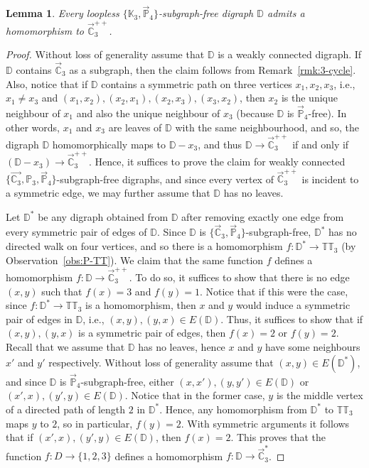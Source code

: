 \documentclass{article}
\newtheorem{lemma}[theorem]{Lemma}
\theoremstyle{definition}
\theoremstyle{remark}
\newcommand{\bC}{{\mathbb C}}
\newcommand{\bD}{{\mathbb D}}
\newcommand{\bK}{{\mathbb K}}
\newcommand{\bP}{{\mathbb P}}
\newcommand{\bT}{{\mathbb T}}
\begin{document}
\begin{lemma}\label{lem:C3++-P4-subgraph-free}
    Every loopless $\{\bK_3,\vec{\bP}_4\}$-subgraph-free digraph $\bD$ admits a homomorphism
    to $\vec{\bC}_3^{++}$.
\end{lemma}
\begin{proof}
    Without loss of generality assume that $\bD$ is a weakly connected digraph. 
    If $\bD$ contains $\vec{\bC}_3$ as a subgraph, then the claim follows from Remark~\ref{rmk:3-cycle}.
    Also, notice that if $\bD$ contains a symmetric path on three vertices $x_1,x_2,x_3$, i.e.,
    $x_1\neq x_3$ and $(x_1,x_2),(x_2,x_1),(x_2,x_3),(x_3,x_2)$, then
    $x_2$ is the unique neighbour of $x_1$ and also the unique neighbour of $x_3$ (because
    $\bD$ is $\vec{\bP}_4$-free). In other words, $x_1$ and $x_3$ are leaves of $\bD$
    with the same neighbourhood, and so, the digraph $\bD$ homomorphically maps to
    $\bD-x_3$, and thus $\bD\to \vec{\bC}_3^{++}$ if and only if $(\bD-x_3)\to \vec{\bC}_3^{++}$.
    Hence, it suffices to prove the claim for weakly connected $\{\vec{\bC_3},\bP_3,\vec{\bP}_4\}$-subgraph-free
    digraphs, and since every vertex of $\vec{\bC}_3^{++}$ is incident to a symmetric
    edge, we may further assume that $\bD$ has no leaves.

    Let $\bD^\ast$ be any digraph obtained from $\bD$ after removing exactly one edge from
    every symmetric pair of edges of $\bD$. Since $\bD$ is $\{\vec{\bC}_3,\vec{\bP}_4\}$-subgraph-free,
    $\bD^\ast$ has no directed walk on four vertices, and so there is a homomorphism
    $f\colon \bD^\ast\to \bT\bT_3$ (by Observation~\ref{obs:P-TT}). We claim that  the 
    same function $f$ defines a homomorphism $f\colon \bD\to \vec{\bC}_3^{++}$. To do so, 
    it suffices to show that there is no edge $(x,y)$ such that $f(x) = 3$ and $f(y) = 1$.
    Notice that if this were the case, since $f\colon \bD^\ast\to \bT\bT_3$ is a homomorphism,
    then $x$ and $y$ would induce a symmetric pair of edges in $\bD$, i.e., $(x,y),(y,x)\in E(\bD)$.
    Thus, it suffices to show that if $(x,y),(y,x)$ is a symmetric pair of edges, then 
    $f(x) =2$ or $f(y) = 2$. Recall that we assume that $\bD$ has no leaves, hence
    $x$ and $y$ have some neighbours $x'$ and $y'$ respectively. Without loss of
    generality assume that $(x,y)\in E(\bD^\ast)$, and since $\bD$ is
    $\vec{\bP}_4$-subgraph-free, either $(x,x'),(y,y')\in E(\bD)$ or
    $(x',x),(y',y)\in E(\bD)$. Notice that in the former case, $y$ is the middle vertex
    of a directed path of length $2$ in $\bD^\ast$. Hence, any homomorphism from $\bD^\ast$
    to $\bT\bT_3$ maps $y$ to $2$, so in particular, $f(y) = 2$. With symmetric
    arguments it follows that if $(x',x),(y',y)\in E(\bD)$, then $f(x) = 2$.
    This proves that the function $f\colon D\to \{1,2,3\}$ defines a homomorphism
    $f\colon \bD\to \vec{\bC}_3^\ast$.
\end{proof}
\end{document}
